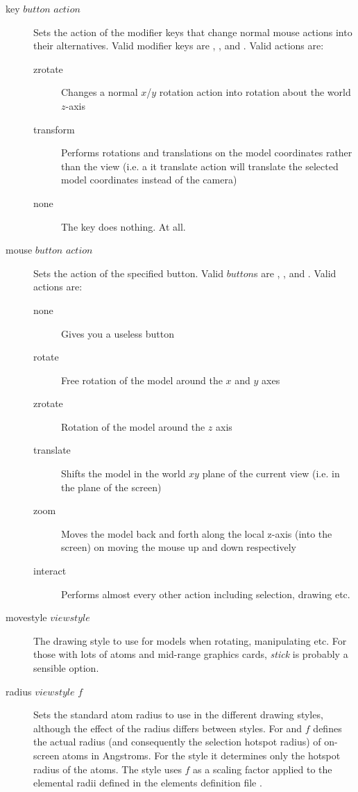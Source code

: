 \begin{description}
	\item[key $button$ $action$\its]
		Sets the action of the modifier keys that change normal mouse actions into their alternatives. Valid modifier keys are , , and . Valid actions are:
			\begin{description}
				\item[zrotate] Changes a normal $x$/$y$ rotation action into rotation about the world $z$-axis
				\item[transform] Performs rotations and translations on the model coordinates rather than the view (i.e. a {it translate} action will translate the selected model coordinates instead of the camera)
				\item[none] The key does nothing. At all.
			\end{description}

	\item[mouse $button$ $action$\its]
		Sets the action of the specified button. Valid $button$s are , , and . Valid actions are:
			\begin{description}
				\item[none] Gives you a useless button
				\item[rotate] Free rotation of the model around the $x$ and $y$ axes
				\item[zrotate] Rotation of the model around the $z$ axis
				\item[translate] Shifts the model in the world $xy$ plane of the current view (i.e. in the plane of the screen)
				\item[zoom] Moves the model back and forth along the local z-axis (into the screen) on moving the mouse up and down respectively
				\item[interact] Performs almost every other action including selection, drawing etc.
			\end{description}
	
	\item[movestyle $viewstyle$\its]
		The drawing style to use for models when rotating, manipulating etc. For those with lots of atoms and mid-range graphics cards, {\it stick} is probably a sensible option.
	

	\item[radius $viewstyle$ $f$]
		Sets the standard atom radius to use in the different drawing styles, although the effect of the radius differs between styles. For  and  $f$ defines the actual radius (and consequently the selection hotspot radius) of on-screen atoms in Angstroms. For the  style it determines only the hotspot radius of the atoms. The  style uses $f$ as a scaling factor applied to the elemental radii defined in the elements definition file .


\end{description}
